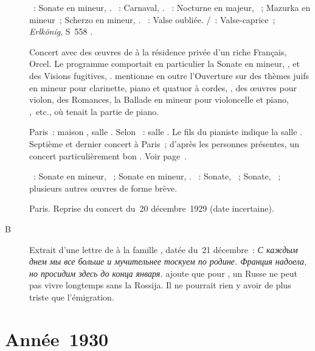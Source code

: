\begin{description}
 \textsc{\Beethoven{}}~: Sonate en \kC mineur, .
 \textsc{\Schumann{}}~: Carnaval, .
 \textsc{\Chopin{}}~: Nocturne en \kF \Sharp majeur,  ~;
 Mazurka en \kC \Sharp mineur~; Scherzo en \kB mineur, .
 \textsc{\Liszt{}}~: Valse oubliée.
 \textsc{\Schubert{}/\Liszt{}}~: Valse-caprice~; \emph{Erlkönig}, S~558
 .
 \item[\DateWithWeekDay{1929-05-25}]
 Concert avec des œuvres de \Prokofiev{} à la résidence privée d'un riche
 Français, Orcel.
 Le programme comportait en particulier la Sonate en \kA mineur, ,
 et des Visions fugitives, .
 \citet[p.~360]{Prokofiev08} mentionne en outre l'\hbox{Ouverture} sur des
 thèmes juifs en \kC mineur pour clarinette, piano et quatuor à cordes,
 , des œuvres pour violon, des Romances, la Ballade en \kC mineur
 pour violoncelle et piano, ,~etc., où \VSofronitsky{} tenait la
 partie de piano.
 \item[\DateWithWeekDay{1929-12-20}]
 Paris~: maison \Pleyel{}, salle \Chopin{}.
 Selon \citet[p.~401]{Scriabine}~: salle \Debussy{}.
 Le fils du pianiste indique la salle \Chopin{}.
 Septième et dernier concert à Paris~; d'après les personnes présentes, un
 concert particulièrement bon \citep[p.~151]{Nekrasova08}.
 Voir page~\pageref{rec:Paris7}.

 \textsc{\Chopin{}}~: Sonate en \kB mineur, ~; Sonate en \kB \Flat
 mineur, .
 \textsc{\Scriabine{}}~: Sonate, ~; Sonate, ~; plusieurs
 autres œuvres de forme brève.
 \item[\DateWithWeekDay{1929-12-21}]
 Paris.
 Reprise du concert du~20 décembre~1929 (date incertaine).
 \item[B\DateWithWeekDay{1929-12-21}]
 Extrait d'une lettre de \VSofronitsky{} à la famille \Vizel{}, datée du~21
 décembre~: \foreignlanguage{russian}{\emph{С каждым днем мы все больше и
 мучительнее тоскуем по родине.
 Франция надоела, но просидим здесь до конца января.}}
 \citep[Voir][p.~151.]{Nekrasova08}
 \citet[p.~132]{Nikonovich08a} ajoute que pour \VSofronitsky{}, un Russe ne
 peut pas vivre longtemps sans la Rossija.
 Il ne pourrait rien y avoir de plus triste que l'émigration.
\end{description}

\section{Année~1930}


